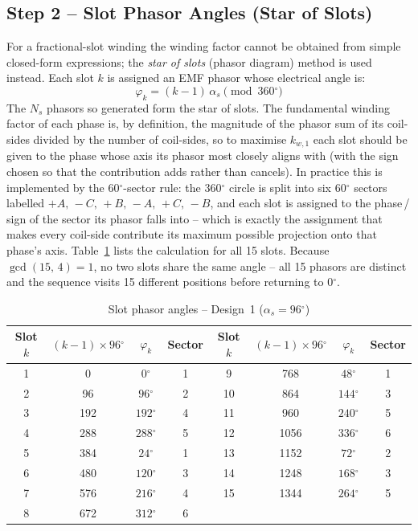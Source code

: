 \documentclass[12pt,a4paper]{article}
\newcommand{\degree}{\ensuremath{^{\circ}}}
\begin{document}
\subsection{Step 2 -- Slot Phasor Angles (Star of Slots)}

For a fractional-slot winding the winding factor cannot be obtained from
simple closed-form expressions; the \emph{star of slots} (phasor diagram)
method is used instead.
Each slot $k$ is assigned an EMF phasor whose electrical angle is:
\begin{equation}
  \varphi_k = (k-1)\,\alpha_s \pmod{360\degree}
  \label{eq:phi_k}
\end{equation}
The $N_s$ phasors so generated form the star of slots.
The fundamental winding factor of each phase is, by definition, the
magnitude of the phasor sum of its coil-sides divided by the number of
coil-sides, so to maximise $k_{w,1}$ each slot should be given to the
phase whose axis its phasor most closely aligns with (with the sign
chosen so that the contribution adds rather than cancels).
In practice this is implemented by the $60\degree$-sector rule:
the $360\degree$ circle is split into six $60\degree$ sectors labelled
$+A,\,-C,\,+B,\,-A,\,+C,\,-B$, and each slot is assigned to the
phase\,/\,sign of the sector its phasor falls into -- which is exactly
the assignment that makes every coil-side contribute its maximum
possible projection onto that phase's axis.
Table~\ref{tab:q2_angles} lists the calculation for all 15 slots.
Because $\gcd(15,\,4)=1$, no two slots share the same angle -- all 15
phasors are distinct and the sequence visits 15 different positions before
returning to $0\degree$.

\begin{table}[H]
  \centering
  \caption{Slot phasor angles -- Design~1 ($\alpha_s = 96\degree$)}
  \label{tab:q2_angles}
  \begin{tabular}{cccc|cccc}
    \toprule
    Slot $k$ & $(k{-}1){\times}96\degree$ & $\varphi_k$ & Sector &
    Slot $k$ & $(k{-}1){\times}96\degree$ & $\varphi_k$ & Sector \\
    \midrule
     1 &    0 &   $0\degree$ & 1 &  9 &  768 &  $48\degree$ & 1 \\
     2 &   96 &  $96\degree$ & 2 & 10 &  864 & $144\degree$ & 3 \\
     3 &  192 & $192\degree$ & 4 & 11 &  960 & $240\degree$ & 5 \\
     4 &  288 & $288\degree$ & 5 & 12 & 1056 & $336\degree$ & 6 \\
     5 &  384 &  $24\degree$ & 1 & 13 & 1152 &  $72\degree$ & 2 \\
     6 &  480 & $120\degree$ & 3 & 14 & 1248 & $168\degree$ & 3 \\
     7 &  576 & $216\degree$ & 4 & 15 & 1344 & $264\degree$ & 5 \\
     8 &  672 & $312\degree$ & 6 &    &      &              &   \\
    \bottomrule
  \end{tabular}
\end{table}
\end{document}
